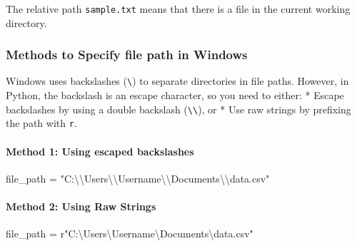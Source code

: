 \documentclass[
  letterpaper,
  DIV=11,
  numbers=noendperiod]{scrreprt}
\let\oldparagraph\paragraph
\renewcommand{\paragraph}[1]{\oldparagraph{#1}\mbox{}}
\newenvironment{Shaded}{\begin{snugshade}}{\end{snugshade}}
\newcommand{\CharTok}[1]{\textcolor[rgb]{0.13,0.47,0.30}{#1}}
\newcommand{\NormalTok}[1]{\textcolor[rgb]{0.00,0.23,0.31}{#1}}
\newcommand{\OperatorTok}[1]{\textcolor[rgb]{0.37,0.37,0.37}{#1}}
\newcommand{\StringTok}[1]{\textcolor[rgb]{0.13,0.47,0.30}{#1}}
\newcommand{\VerbatimStringTok}[1]{\textcolor[rgb]{0.13,0.47,0.30}{#1}}
\begin{document}
The relative path \texttt{sample.txt} means that there is a file in the
current working directory.

\hypertarget{methods-to-specify-file-path-in-windows}{%
\subsubsection{Methods to Specify file path in
Windows}\label{methods-to-specify-file-path-in-windows}}

Windows uses backslashes (\texttt{\textbackslash{}}) to separate
directories in file paths. However, in Python, the backslash is an
escape character, so you need to either: * Escape backslashes by using a
double backslash (\texttt{\textbackslash{}\textbackslash{}}), or * Use
raw strings by prefixing the path with \texttt{r}.

\hypertarget{method-1-using-escaped-backslashes}{%
\paragraph{\texorpdfstring{Method 1: \textbf{Using escaped
backslashes}}{Method 1: Using escaped backslashes}}\label{method-1-using-escaped-backslashes}}

\begin{Shaded}
\begin{Highlighting}[]
\NormalTok{file\_path }\OperatorTok{=} \StringTok{"C:}\CharTok{\textbackslash{}\textbackslash{}}\StringTok{Users}\CharTok{\textbackslash{}\textbackslash{}}\StringTok{Username}\CharTok{\textbackslash{}\textbackslash{}}\StringTok{Documents}\CharTok{\textbackslash{}\textbackslash{}}\StringTok{data.csv"}
\end{Highlighting}
\end{Shaded}

\hypertarget{method-2-using-raw-strings}{%
\paragraph{\texorpdfstring{Method 2: \textbf{Using Raw
Strings}}{Method 2: Using Raw Strings}}\label{method-2-using-raw-strings}}

\begin{Shaded}
\begin{Highlighting}[]
\NormalTok{file\_path }\OperatorTok{=} \VerbatimStringTok{r"C:\textbackslash{}Users\textbackslash{}Username\textbackslash{}Documents\textbackslash{}data.csv"}
\end{Highlighting}
\end{Shaded}
\end{document}
